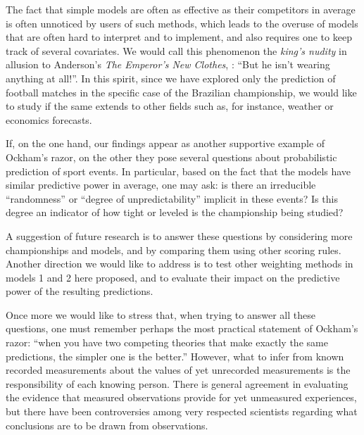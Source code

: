 \documentclass[journal,article,accept,moreauthors,pdftex,12pt,a4paper]{mdpi}
\begin{document}
{\color{blue}The fact that simple models are often as effective as their competitors in average is often unnoticed by users of such methods, which leads to the overuse of models that are often
	hard to interpret and to implement, and also requires one to keep track of several covariates. We would call this phenomenon the {\it king's nudity} in allusion to Anderson's {\it The Emperor's New Clothes}, \cite{emperor}: ``But he isn't wearing anything at all!''. In this spirit, since we have explored only the prediction of football matches in the specific case of the Brazilian championship, we would like to study if the same extends to other fields such as, for instance, weather or economics forecasts.}
		
		If, on the one hand, our findings appear as another supportive example of Ockham's razor, on the other they pose several questions about probabilistic prediction of sport events.
		In particular, based on the fact that the models have similar {\color{darkgreen}predictive power in average}, one may ask: is there an irreducible ``randomness'' or ``degree of unpredictability'' implicit in these events?
		Is this degree an indicator of how tight or leveled is the championship being studied?
		
		A suggestion of future research is to answer these questions by considering more championships and models, and by comparing them using other scoring rules.
		Another direction we would like to address is to test other weighting methods in models 1 and 2 here
		proposed, and to evaluate their impact on the predictive power of the resulting predictions.
		
		Once more we would like to stress that, when trying to answer all these questions, one must remember perhaps the most practical statement of Ockham's razor: ``when you have two competing theories that make exactly the same predictions, the simpler one is the better.''
		However, what to infer from known recorded measurements about the values of yet unrecorded measurements is the responsibility of each knowing person.
		There is general agreement in evaluating the evidence that measured observations provide for yet unmeasured experiences, but there have been controversies among very respected scientists regarding what conclusions are to be drawn from observations.
		
		
		
		
\end{document}
